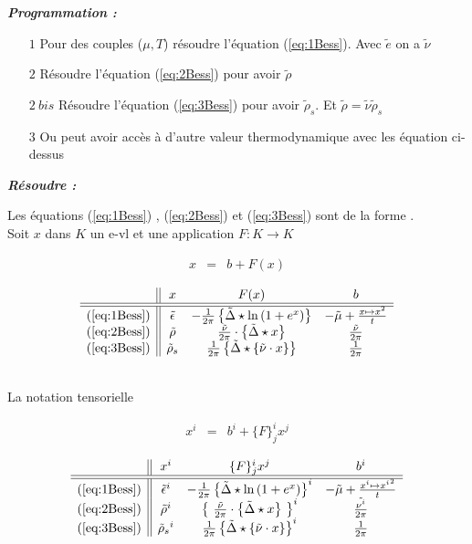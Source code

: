 { \bf \em Programmation :}

\begin{itemize}
	\item[$1$] Pour des couples ($\mu , T $) résoudre l'équation (\ref{eq:1Bess}). Avec $\tilde{e}$ on a $\tilde{\nu}$
	\item[$2$] Résoudre l'équation (\ref{eq:2Bess}) pour avoir $\tilde{\rho}$
	\item[$2 ~bis$] Résoudre l'équation (\ref{eq:3Bess}) pour avoir $\tilde{\rho}_s$. Et $\tilde{\rho} = \tilde{\nu} \tilde{\rho}_s$
	\item[$3$] Ou peut avoir accès à d'autre valeur thermodynamique avec les équation ci-dessus
\end{itemize}

{ \bf \em Résoudre :}



Les équations (\ref{eq:1Bess}) ,   (\ref{eq:2Bess}) et  (\ref{eq:3Bess}) sont de la forme .\\

Soit $x$ dans $K$ un e-vl  et une application $F \colon K \rightarrow K $

\begin{eqnarray}
	x & = & b + F ( x ) 	
\end{eqnarray}


$$
\begin{array}{c||ccc}
	& x & F( x )  & b \\
	\hline\hline
	(\ref{eq:1Bess}) & \tilde{\epsilon} & - \frac{1}{2 \pi} \left \{\tilde{\Delta} \star \ln \left ( 1 + e^{x} \right )  \right \} & - \tilde{\mu} + \frac{x \mapsto x^2 }{t}	\\
	(\ref{eq:2Bess}) & \tilde{\rho}  & \frac{\tilde{\nu}}{2 \pi} \cdot  \left \{\tilde{\Delta} \star x \right \} & \frac{\tilde{\nu}}{2 \pi} \\
	(\ref{eq:3Bess}) & \tilde{\rho}_s  & \frac{1}{2 \pi} \left \{\tilde{\Delta} \star \{\tilde{\nu} \cdot  x\} \right \} & \frac{1}{2 \pi} 
\end{array}
$$

{~}\\

La notation tensorielle 


\begin{eqnarray}
	x^i & = & b^i + \{F\}^i_j  x^j  	
\end{eqnarray}


$$
\begin{array}{c||ccc}
	& x^i & \{F\}^i_j  x^j & b^i\\
	\hline\hline
	(\ref{eq:1Bess}) & \tilde{\epsilon}^i & - \frac{1}{2 \pi} \left \{\tilde{\Delta} \star \ln \left ( 1 + e^{x } \right )  \right \}^i  & - \tilde{\mu} + \frac{x^i  \mapsto {x^i }^2 }{t}	\\
	(\ref{eq:2Bess}) & \tilde{\rho}^i  &  \left  \{ \frac{\tilde{\nu}}{2 \pi} \cdot \left \{\tilde{\Delta} \star x \right  \} \right \}^i & \frac{\tilde{\nu^i}}{2 \pi} \\
	(\ref{eq:3Bess}) & {\tilde{\rho}_s}^i  &  \frac{1}{2 \pi} \left \{\tilde{\Delta} \star \{\tilde{\nu} \cdot  x\} \right \}^i & \frac{1}{2 \pi} 
\end{array}
$$

